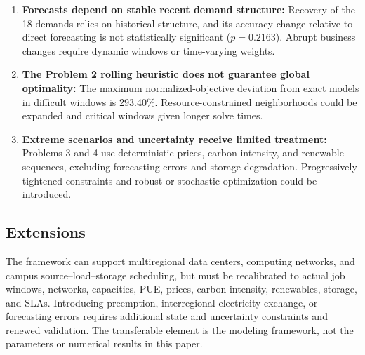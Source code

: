 \begin{enumerate}
    \item \textbf{Forecasts depend on stable recent demand structure:}
    Recovery of the 18 demands relies on historical structure, and its accuracy change relative to direct forecasting is not statistically significant ($p=0.2163$). Abrupt business changes require dynamic windows or time-varying weights.
	
    \item \textbf{The Problem 2 rolling heuristic does not guarantee global optimality:}
    The maximum normalized-objective deviation from exact models in difficult windows is 293.40\%. Resource-constrained neighborhoods could be expanded and critical windows given longer solve times.
	
    \item \textbf{Extreme scenarios and uncertainty receive limited treatment:}
    Problems 3 and 4 use deterministic prices, carbon intensity, and renewable sequences, excluding forecasting errors and storage degradation. Progressively tightened constraints and robust or stochastic optimization could be introduced.
\end{enumerate}


\subsection{Extensions}

The framework can support multiregional data centers, computing networks, and campus source--load--storage scheduling, but must be recalibrated to actual job windows, networks, capacities, PUE, prices, carbon intensity, renewables, storage, and SLAs. Introducing preemption, interregional electricity exchange, or forecasting errors requires additional state and uncertainty constraints and renewed validation. The transferable element is the modeling framework, not the parameters or numerical results in this paper.
